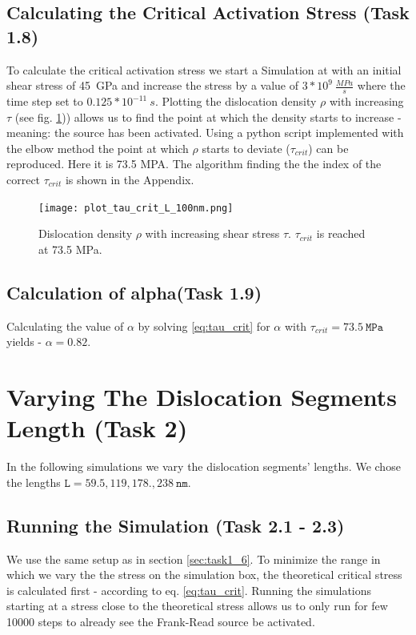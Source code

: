\subsection{Calculating the Critical Activation Stress (Task 1.8)}
To calculate the critical activation stress we start a Simulation at with an initial shear stress of 45~GPa and increase the stress by a value of \(3*10^{9}~\frac{MPa}{s}\) where the time step set to \(0.125*10^{-11}~s\). Plotting the dislocation density \(\rho\) with increasing \(\tau\) (see fig. \ref{fig:tau_vs_rho})) allows us to find the point at which the density starts to increase - meaning: the source has been activated. Using a python script implemented with the elbow method the point at which \(\rho\) starts to deviate (\(\tau_{crit}\)) can be reproduced. Here it is 73.5 MPA. The algorithm finding the the index of the correct \(\tau_{crit}\) is shown in the Appendix.

\begin{figure}[htb]
	\centering
	\texttt{[image: plot\_tau\_crit\_L\_100nm.png]}
	\caption{Dislocation density \(\rho\) with increasing shear stress \(\tau\). \(\tau_{crit}\) is reached at 73.5 MPa. }
	\label{fig:tau_vs_rho}	
\end{figure}

\subsection{Calculation of alpha(Task 1.9)}

Calculating the value of \(\alpha\) by solving \ref{eq:tau_crit} for \(\alpha \) with \(\tau_{crit}=73.5~\mathtt{MPa} \) yields - \(\alpha = 0.82\).

\section{Varying The Dislocation Segments Length (Task 2)}\label{sec:task2}
In the following simulations we vary the dislocation segments' lengths. We chose the lengths \(\mathtt{L}=59.5 , 119, 178., 238~\mathtt{nm}\).
\subsection{Running the Simulation (Task 2.1 - 2.3)}
We use the same setup as in section \ref{sec:task1_6}. To minimize the range in which we vary the the stress on the simulation  box, the theoretical critical stress is calculated first - according to eq. \ref{eq:tau_crit}.  Running the simulations starting at a stress close to the theoretical stress allows us to only run for few 10000 steps to already see the Frank-Read source be activated. 

